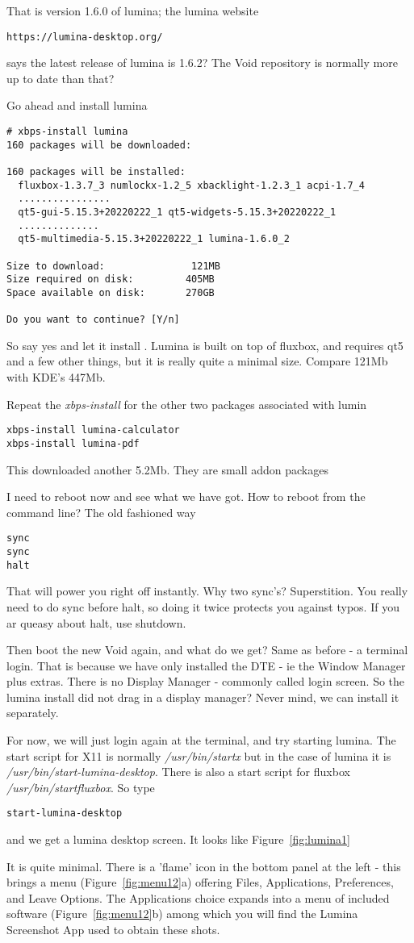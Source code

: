 \documentclass{article}  %
\begin{document}
That is version 1.6.0 of lumina; the lumina website 
\begin{verbatim}
https://lumina-desktop.org/
\end{verbatim}
says the latest release of lumina is 1.6.2?  The Void repository is normally more up to date than that?

 Go ahead and install lumina
\begin{verbatim}
# xbps-install lumina
160 packages will be downloaded:

160 packages will be installed:
  fluxbox-1.3.7_3 numlockx-1.2_5 xbacklight-1.2.3_1 acpi-1.7_4 
  ................
  qt5-gui-5.15.3+20220222_1 qt5-widgets-5.15.3+20220222_1 
  ..............
  qt5-multimedia-5.15.3+20220222_1 lumina-1.6.0_2

Size to download:               121MB
Size required on disk:         405MB
Space available on disk:       270GB

Do you want to continue? [Y/n] 
\end{verbatim}
So say yes and let it install . Lumina is built on top of fluxbox, and requires qt5 and a few other things, but it is really quite a minimal size. Compare 121Mb with KDE's 447Mb.

Repeat the {\em xbps-install} for the other two packages associated with lumin
\begin{verbatim}
xbps-install lumina-calculator
xbps-install lumina-pdf
\end{verbatim}
This downloaded another 5.2Mb. They are small addon packages

I need to reboot now and see what we have got. How to reboot from the command line? The old fashioned way
\begin{verbatim}
sync
sync
halt
\end{verbatim}
That will power you right off instantly. Why two sync's? Superstition. You really need to do sync before halt, so doing it twice protects you against typos. If you ar queasy about halt, use shutdown.

Then boot the new Void again, and what do we get? Same as before - a terminal login. That is because we have only installed the DTE - ie the Window Manager plus extras. There is no Display Manager - commonly called login screen. So the lumina install did not drag in a display manager? Never mind, we can install it separately.

For now, we will just login again at the terminal, and try starting lumina. The start script for X11 is normally {\em /usr/bin/startx} but in the case of lumina it is {\em /usr/bin/start-lumina-desktop}. There is also a start script for fluxbox {\em /usr/bin/startfluxbox}. So type
\begin{verbatim}
start-lumina-desktop
\end{verbatim}
and we get a lumina desktop screen. It looks like Figure~\ref{fig:lumina1}

It is quite minimal. There is a 'flame' icon in the bottom panel at the left - this brings a menu (Figure~\ref{fig:menu12}a) offering Files, Applications, Preferences, and Leave Options. The Applications choice expands into a menu of included software (Figure~\ref{fig:menu12}b) among which you will find the Lumina Screenshot App used to obtain these shots.   

\end{document}
